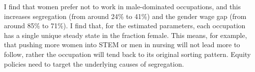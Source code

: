 \documentclass[12pt]{article}
\begin{document}


I find that women prefer not to work in male-dominated occupations, and this increases segregation (from around 24\% to 41\%) and the gender wage gap (from around 85\% to 71\%). I find that, for the estimated parameters, each occupation has a single unique steady state in the fraction female. This means, for example, that pushing more women into STEM or men in nursing will not lead more to follow, rather the occupation will tend back to its original sorting pattern. Equity policies need to target the underlying causes of segregation.




\end{document}
